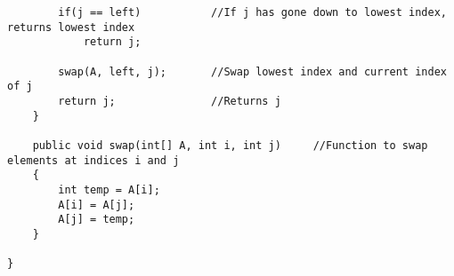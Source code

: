 \documentclass[ProgramminAssignment.tex]{subfiles}
\begin{document}
\begin{lstlisting}
		if(j == left)			//If j has gone down to lowest index, returns lowest index
			return j;
		
		swap(A, left, j);		//Swap lowest index and current index of j
		return j;				//Returns j
	}
	
	public void swap(int[] A, int i, int j)		//Function to swap elements at indices i and j
	{
		int temp = A[i];
		A[i] = A[j];
		A[j] = temp;
	}
	
}

\end{lstlisting}
\end{document}
